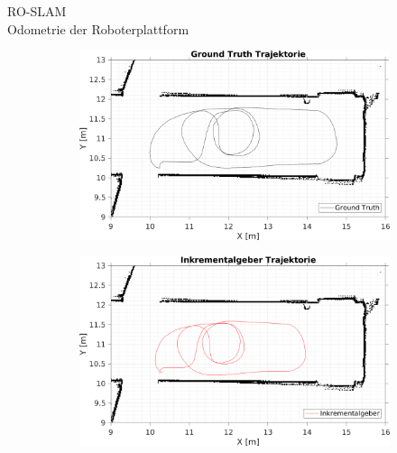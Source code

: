 \documentclass{beamer}
\begin{document}
%
%
\begin{frame}{RO-SLAM\\\normalsize{Odometrie der Roboterplattform}}

	\begin{figure}
		\centering
		\begin{subfigure}{0.47\linewidth}
			\centering
			\includegraphics[width=\linewidth]{Record_2018-02-08-12-33-53_trajectory1}
		\end{subfigure}
		\hfill
		\begin{subfigure}{0.47\linewidth}
			\centering
			\includegraphics[width=\linewidth]{Record_2018-02-08-12-33-53_trajectory2}
		\end{subfigure}
		\par

\end{figure}
\end{frame}
\end{document}
